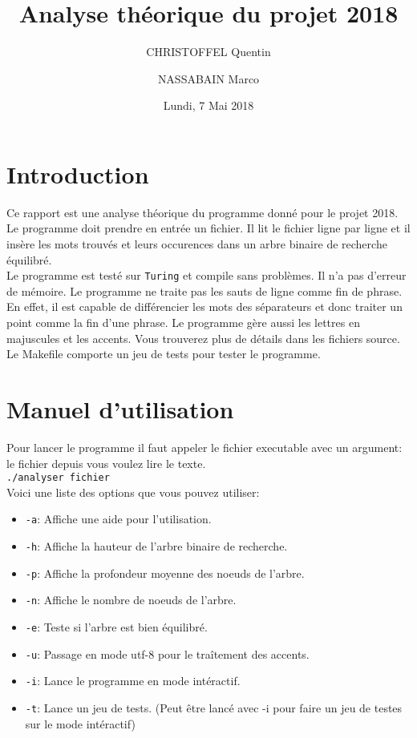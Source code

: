 \documentclass[11pt]{article}
\title{Analyse théorique du projet 2018}
\author{
    CHRISTOFFEL Quentin
    \and
    NASSABAIN Marco
}
\date{Lundi, 7 Mai 2018}
\begin{document}
\maketitle


\section{Introduction}
    Ce rapport est une analyse théorique du programme donné pour le projet 2018.
    Le programme doit prendre en entrée un fichier. Il lit le fichier ligne
    par ligne et il insère les mots trouvés et leurs occurences dans un arbre
    binaire de recherche équilibré.\\

    Le programme est testé sur \texttt{Turing} et compile sans problèmes. Il n'a
    pas d'erreur de mémoire. Le
    programme ne traite pas les sauts de ligne comme fin de phrase. En effet,
    il est capable de différencier les mots des séparateurs et donc traiter un
    point comme la fin d'une phrase. Le programme gère aussi les lettres en
    majuscules et les accents. Vous trouverez plus de détails dans les fichiers
    source. Le Makefile comporte un jeu de tests pour tester le programme.\\


\section{Manuel d'utilisation}
    Pour lancer le programme il faut appeler le fichier executable avec un
    argument: le fichier depuis vous voulez lire le texte.\\
        \texttt{./analyser fichier}\\

    \noindent
    Voici une liste des options que vous pouvez utiliser:

    \begin{itemize}
        \item \texttt{-a}: Affiche une aide pour l'utilisation.
        \item \texttt{-h}: Affiche la hauteur de l'arbre binaire de recherche.
        \item \texttt{-p}: Affiche la profondeur moyenne des noeuds de l'arbre.
        \item \texttt{-n}: Affiche le nombre de noeuds de l'arbre.
        \item \texttt{-e}: Teste si l'arbre est bien équilibré.
        \item \texttt{-u}: Passage en mode utf-8 pour le traîtement des accents.
        \item \texttt{-i}: Lance le programme en mode intéractif.
        \item \texttt{-t}: Lance un jeu de tests. (Peut être lancé avec -i pour 
        faire un jeu de testes sur le mode intéractif)
    \end{itemize}
\end{document}
